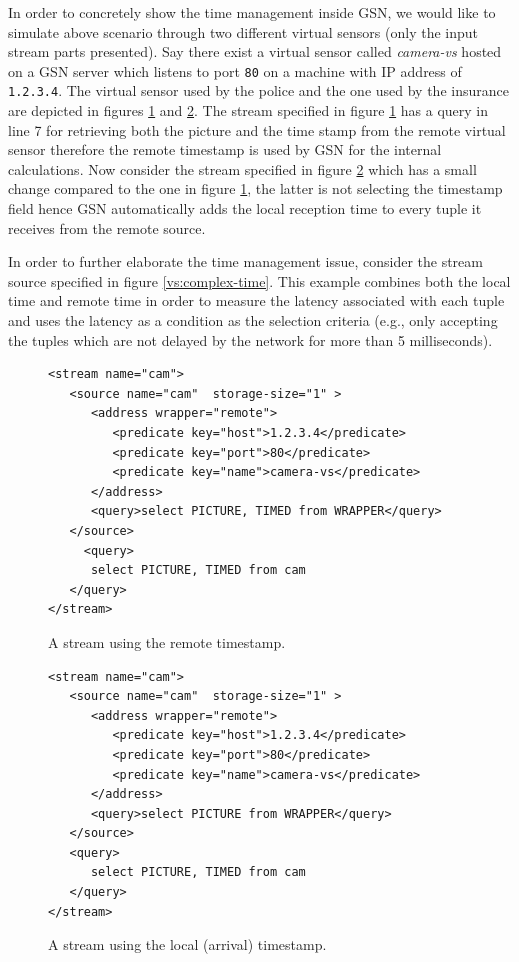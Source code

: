 In order to concretely show the time management inside GSN, we would like to
simulate above scenario through two different virtual sensors (only the input stream parts presented).
Say there exist a virtual sensor called \emph{camera-vs} hosted on a GSN server which listens to port \texttt{80} on a machine with IP address of \texttt{1.2.3.4}.
The virtual sensor used by the police and the one used by the insurance are depicted in figures \ref{vs:police} and \ref{vs:insurance}.
The stream specified in figure \ref{vs:police} has a query in line 7 for retrieving both the picture and the time stamp from the remote virtual sensor therefore
the remote timestamp is used by GSN for the internal calculations. Now consider the stream specified in figure \ref{vs:insurance} which has a small change compared to the one in figure \ref{vs:police}, the latter is not selecting the timestamp field hence GSN automatically adds the local reception time to every tuple it receives from the remote source.

In order to further elaborate the time management issue, consider the stream source specified in figure \ref{vs:complex-time}. This example combines both
the local time and remote time in order to measure the latency associated with each tuple and uses the latency as a condition as the selection
criteria (e.g., only accepting the tuples which are not delayed by the network for more than 5 milliseconds).

\begin{figure}%
  \centering
  \lstset{numbers=left, numberstyle=\footnotesize}
\begin{lstlisting}
<stream name="cam">
   <source name="cam"  storage-size="1" >
      <address wrapper="remote">
         <predicate key="host">1.2.3.4</predicate>
         <predicate key="port">80</predicate>
         <predicate key="name">camera-vs</predicate>
      </address>
      <query>select PICTURE, TIMED from WRAPPER</query>
   </source>
	 <query>
      select PICTURE, TIMED from cam
   </query>
</stream>
\end{lstlisting}
  \caption{A stream using the remote timestamp.}
  \label{vs:police}
\end{figure}

\begin{figure}%
  \centering
  \lstset{numbers=left, numberstyle=\footnotesize}
\begin{lstlisting}
<stream name="cam">
   <source name="cam"  storage-size="1" >
      <address wrapper="remote">
         <predicate key="host">1.2.3.4</predicate>
         <predicate key="port">80</predicate>
         <predicate key="name">camera-vs</predicate>
      </address>
      <query>select PICTURE from WRAPPER</query>
   </source>
   <query>
      select PICTURE, TIMED from cam
   </query>
</stream>
\end{lstlisting}
 \caption{A stream using the local (arrival) timestamp.}
  \label{vs:insurance}
\end{figure}

